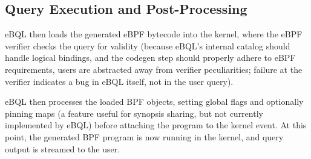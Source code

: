 \subsection{Query Execution and Post-Processing}

eBQL then loads the generated eBPF bytecode into the kernel, where the eBPF verifier checks the
query for validity (because eBQL's internal catalog should handle logical bindings, and the codegen
step should properly adhere to eBPF requirements, users are abstracted away from verifier
peculiarities; failure at the verifier indicates a bug in eBQL itself, not in the user query).

eBQL then processes the loaded BPF objects, setting global flags and optionally pinning maps (a
feature useful for synopsis sharing, but not currently implemented by eBQL) before attaching the
program to the kernel event. At this point, the generated BPF program is now running in the kernel,
and query output is streamed to the user.

